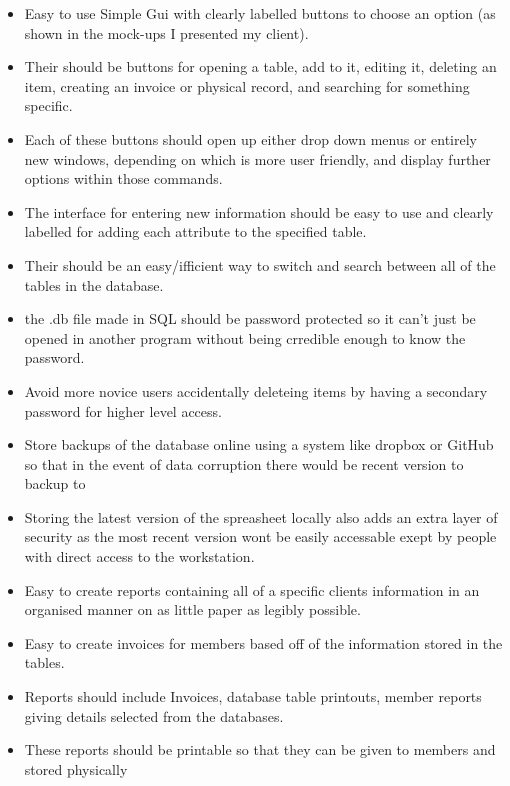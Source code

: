 \begin{itemize}
        \item Easy to use Simple Gui with clearly labelled buttons to choose an option (as shown in the mock-ups I presented my client).
        \item Their should be buttons for opening a table, add to it, editing it, deleting an item, creating an invoice or physical record, and searching for something specific.
        \item Each of these buttons should open up either drop down menus or entirely new windows, depending on which is more user friendly, and display further options within those commands.
        \item The interface for entering new information should be easy to use and clearly labelled for adding each attribute to the specified table.
        \item Their should be an easy/ifficient way to switch and search between all of the tables in the database.
        \item the .db file made in SQL should be password protected so it can't just be opened in another program without being crredible enough to know the password.
        \item Avoid more novice users accidentally deleteing items by having a secondary password for higher level access.
        \item Store backups of the database online using a system like dropbox or GitHub so that in the event of data corruption there would be recent version to backup to
        \item Storing the latest version of the spreasheet locally also adds an extra layer of security as the most recent version wont be easily accessable exept by people with direct access to the workstation.
                \item Easy to create reports containing all of a specific clients information in an organised manner on as little paper as legibly possible.
        \item Easy to create invoices for members based off of the information stored in the tables.
        \item Reports should include Invoices, database table printouts, member reports giving details selected from the databases.
        \item These reports should be printable so that they can be given to members and stored physically
        

\end{itemize}


